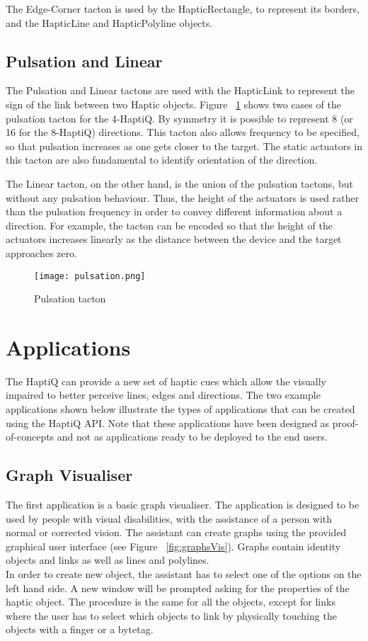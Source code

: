 The Edge-Corner tacton is used by the HapticRectangle, to represent its borders, and the HapticLine and HapticPolyline objects. 

\subsection{Pulsation and Linear}
The Pulsation and Linear tactons are used with the HapticLink to represent the sign of the link between two Haptic objects. Figure ~\ref{fig:pulsation} shows two cases of the pulsation tacton for the 4-HaptiQ. By symmetry it is possible to represent 8 (or 16 for the 8-HaptiQ) directions. This tacton also allows frequency to be specified, so that pulsation increases as one gets closer to the target. The static actuators in this tacton are also fundamental to identify orientation of the direction.

The Linear tacton, on the other hand, is the union of the pulsation tactons, but without any pulsation behaviour. Thus, the height of the actuators is used rather than the pulsation frequency in order to convey different information about a direction. For example, the tacton can be encoded so that the height of the actuators increases linearly as the distance between the device and the target approaches zero.

\begin{figure}[H]
  \centering
  \texttt{[image: pulsation.png]}
  \caption{Pulsation tacton}
  \label{fig:pulsation}
\end{figure}

\section{Applications}

The HaptiQ can provide a new set of haptic cues which allow the visually impaired to better perceive lines, edges and directions. The two example applications shown below illustrate the types of applications that can be created using the HaptiQ API. Note that these applications have been designed as proof-of-concepts and not as applications ready to be deployed to the end users.

\subsection{Graph Visualiser}
\label{sec:graphVis}

The first application is a basic graph visualiser. The application is designed to be used by people with visual disabilities, with the assistance of a person with normal or corrected vision. The assistant can create graphs using the provided graphical user interface (see Figure ~\ref{fig:graphsVis}). Graphs contain identity objects and links as well as lines and polylines. \\
In order to create new object, the assistant has to select one of the options on the left hand side. A new window will be prompted asking for the properties of the haptic object. The procedure is the same for all the objects, except for links where the user has to select which objects to link by physically touching the objects with a finger or a bytetag. 

